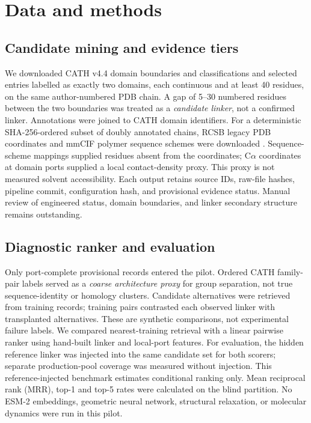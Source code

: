 \documentclass[10pt,a4paper]{article}
\begin{document}
\section{Data and methods}
\subsection{Candidate mining and evidence tiers}
We downloaded CATH v4.4 domain boundaries and classifications \cite{cath} and selected entries labelled as exactly two domains, each continuous and at least 40 residues, on the same author-numbered PDB chain. A gap of 5--30 numbered residues between the two boundaries was treated as a \emph{candidate linker}, not a confirmed linker. Annotations were joined to CATH domain identifiers. For a deterministic SHA-256-ordered subset of doubly annotated chains, RCSB legacy PDB coordinates and mmCIF polymer sequence schemes were downloaded \cite{rcsb}. Sequence-scheme mappings supplied residues absent from the coordinates; C$\alpha$ coordinates at domain ports supplied a local contact-density proxy. This proxy is not measured solvent accessibility. Each output retains source IDs, raw-file hashes, pipeline commit, configuration hash, and provisional evidence status. Manual review of engineered status, domain boundaries, and linker secondary structure remains outstanding.

\subsection{Diagnostic ranker and evaluation}
Only port-complete provisional records entered the pilot. Ordered CATH family-pair labels served as a \emph{coarse architecture proxy} for group separation, not true sequence-identity or homology clusters. Candidate alternatives were retrieved from training records; training pairs contrasted each observed linker with transplanted alternatives. These are synthetic comparisons, not experimental failure labels. We compared nearest-training retrieval with a linear pairwise ranker using hand-built linker and local-port features. For evaluation, the hidden reference linker was injected into the same candidate set for both scorers; separate production-pool coverage was measured without injection. This reference-injected benchmark estimates conditional ranking only. Mean reciprocal rank (MRR), top-1 and top-5 rates were calculated on the blind partition. No ESM-2 embeddings, geometric neural network, structural relaxation, or molecular dynamics were run in this pilot.
\end{document}
